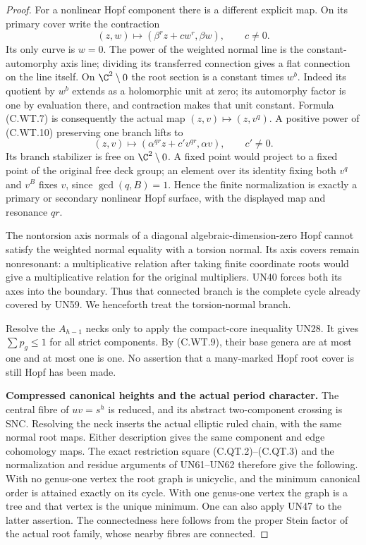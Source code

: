 \begin{proof}
For a nonlinear Hopf component there is a
different explicit map. On its primary cover
write the contraction
\[
                    (z,w)\longmapsto
                     (\beta^r z+c w^r,\beta w),
                 \qquad c\ne0 .
 \tag{C.WT.10}
\]
Its only curve is \(w=0\). The power of the
weighted normal line is the constant-automorphy
axis line; dividing its transferred connection
gives a flat connection on the line itself.
On \(\C^2\setminus0\) the root section is a
constant times \(w^b\). Indeed its quotient
by \(w^b\) extends as a holomorphic unit at
zero; its automorphy factor is one by
evaluation there, and contraction makes that
unit constant. Formula (C.WT.7) is consequently
the actual map \((z,v)\mapsto(z,v^q)\).
A positive power of (C.WT.10) preserving one
branch lifts to
\[
                 (z,v)\longmapsto
                    (\alpha^{qr}z+c'v^{qr},\alpha v),
                     \qquad c'\ne0 .
 \tag{C.WT.11}
\]
Its branch stabilizer is free on
\(\C^2\setminus0\). A fixed point would project
to a fixed point of the original free deck
group; an element over its identity fixing
both \(v^q\) and \(v^B\) fixes \(v\), since
\(\gcd(q,B)=1\). Hence the finite normalization
is exactly a primary or secondary nonlinear
Hopf surface, with the displayed map and
resonance \(qr\).

The nontorsion axis normals of a diagonal
algebraic-dimension-zero Hopf cannot satisfy
the weighted normal equality with a torsion
normal. Its axis covers remain nonresonant:
a multiplicative relation after taking finite
coordinate roots would give a multiplicative
relation for the original multipliers.
UN40 forces both its axes into the boundary.
Thus that connected branch is the complete
cycle already covered by UN59. We henceforth
treat the torsion-normal branch.

Resolve the \(A_{h-1}\) necks only to apply
the compact-core inequality UN28. It gives
\(\sum p_g\le1\) for all strict components.
By (C.WT.9), their base genera are at most one
and at most one is one. No assertion that
a many-marked Hopf root cover is still Hopf
has been made.

\par\medskip\noindent\textbf{Compressed canonical heights and the actual period character.}
The central fibre of \(uv=s^h\) is reduced,
and its abstract two-component crossing is
SNC. Resolving the neck inserts the actual
elliptic ruled chain, with the same normal
root maps. Either description gives the
same component and edge cohomology maps.
The exact restriction square (C.QT.2)--(C.QT.3)
and the normalization and residue arguments
of UN61--UN62 therefore give the following.
With no genus-one vertex the root graph is
unicyclic, and the minimum canonical order
is attained exactly on its cycle. With one
genus-one vertex the graph is a tree and
that vertex is the unique minimum. One can
also apply UN47 to the latter assertion.
The connectedness here follows from the
proper Stein factor of the actual root
family, whose nearby fibres are connected.


\end{proof}
